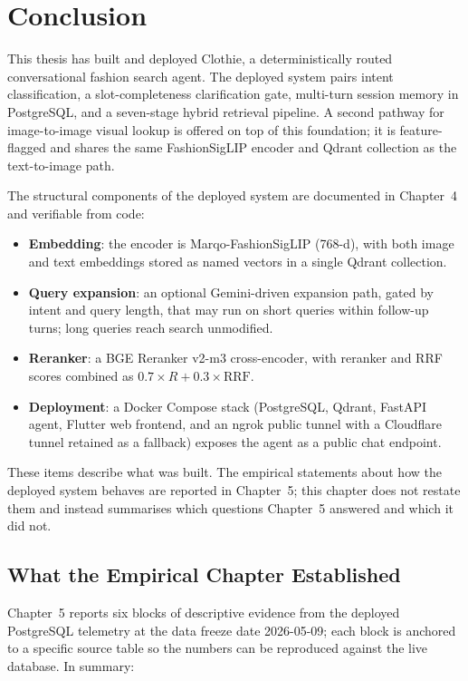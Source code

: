 
\section{Conclusion}
This thesis has built and deployed Clothie, a deterministically routed conversational fashion search agent. The deployed system pairs intent classification, a slot-completeness clarification gate, multi-turn session memory in PostgreSQL, and a seven-stage hybrid retrieval pipeline. A second pathway for image-to-image visual lookup is offered on top of this foundation; it is feature-flagged and shares the same FashionSigLIP encoder and Qdrant collection as the text-to-image path.

The structural components of the deployed system are documented in Chapter~4 and verifiable from code:

\begin{itemize}
    \item \textbf{Embedding}: the encoder is Marqo-FashionSigLIP (768-d), with both image and text embeddings stored as named vectors in a single Qdrant collection.
    \item \textbf{Query expansion}: an optional Gemini-driven expansion path, gated by intent and query length, that may run on short queries within follow-up turns; long queries reach search unmodified.
    \item \textbf{Reranker}: a BGE Reranker v2-m3 cross-encoder, with reranker and RRF scores combined as $0.7\times R + 0.3\times \text{RRF}$.
    \item \textbf{Deployment}: a Docker Compose stack (PostgreSQL, Qdrant, FastAPI agent, Flutter web frontend, and an ngrok public tunnel with a Cloudflare tunnel retained as a fallback) exposes the agent as a public chat endpoint.
\end{itemize}

These items describe what was built. The empirical statements about how the deployed system behaves are reported in Chapter~5; this chapter does not restate them and instead summarises which questions Chapter~5 answered and which it did not.

\subsection{What the Empirical Chapter Established}
\label{subsec:empirical_summary}

Chapter~5 reports six blocks of descriptive evidence from the deployed PostgreSQL telemetry at the data freeze date 2026-05-09; each block is anchored to a specific source table so the numbers can be reproduced against the live database. In summary:

